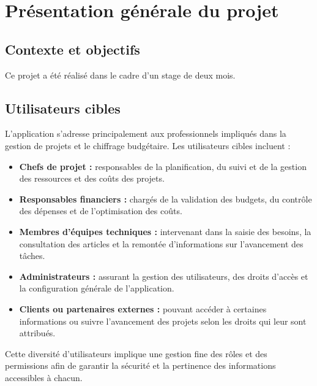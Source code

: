 \documentclass[12pt,a4paper]{report}
\begin{document}
\chapter{Présentation générale du projet }
\section{Contexte et objectifs}
Ce projet a été réalisé dans le cadre d’un stage de deux mois.  
\section{Utilisateurs cibles}
L’application s’adresse principalement aux professionnels impliqués dans la gestion de projets et le chiffrage budgétaire. Les utilisateurs cibles incluent :

\begin{itemize}
    \item \textbf{Chefs de projet :} responsables de la planification, du suivi et de la gestion des ressources et des coûts des projets.
    \item \textbf{Responsables financiers :} chargés de la validation des budgets, du contrôle des dépenses et de l’optimisation des coûts.
    \item \textbf{Membres d’équipes techniques :} intervenant dans la saisie des besoins, la consultation des articles et la remontée d’informations sur l’avancement des tâches.
    \item \textbf{Administrateurs :} assurant la gestion des utilisateurs, des droits d’accès et la configuration générale de l’application.
    \item \textbf{Clients ou partenaires externes :} pouvant accéder à certaines informations ou suivre l’avancement des projets selon les droits qui leur sont attribués.
\end{itemize}

Cette diversité d’utilisateurs implique une gestion fine des rôles et des permissions afin de garantir la sécurité et la pertinence des informations accessibles à chacun.
\end{document}
